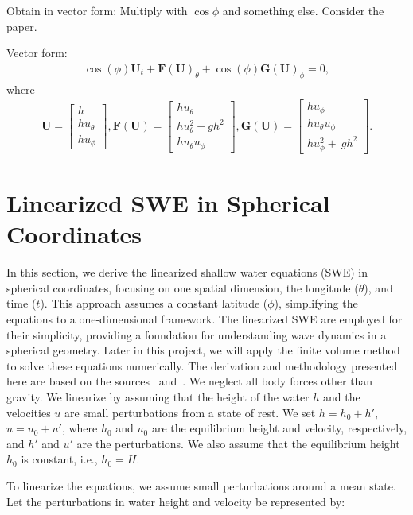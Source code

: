 Obtain in vector form:
Multiply with $\cos \phi$ and something else. Consider the paper.

Vector form:
\begin{align}
    \cos(\phi) \mathbf{U}_t + \mathbf{F(U)}_\theta + \cos(\phi) \mathbf{G(U)}_\phi = 0,
\end{align}
where 
\begin{align*}
    \mathbf{U} = \begin{bmatrix} h \\ h u_\theta \\h u_\phi \end{bmatrix},
    \mathbf{F(U)} = \begin{bmatrix} h u_\theta \\ h u_\theta^2 + g h^2  \\ h u_\theta u_\phi \end{bmatrix},
    \mathbf{G(U)} = \begin{bmatrix} h u_\phi \\ h u_\theta u_\phi \\ h u_\phi^2 + \ g h^2 \end{bmatrix}.
\end{align*}



\section{Linearized SWE in Spherical Coordinates}
In this section, we derive the linearized shallow water equations (SWE) in spherical coordinates, focusing on one spatial dimension, the longitude ($\theta$), and time ($t$).
This approach assumes a constant latitude ($\phi$), simplifying the equations to a one-dimensional framework.
The linearized SWE are employed for their simplicity, providing a foundation for understanding wave dynamics in a spherical geometry.
Later in this project, we will apply the finite volume method to solve these equations numerically.
The derivation and methodology presented here are based on the sources~\cite{BONEV_2018} and~\cite{Eskilsson_2005}.
We neglect all body forces other than gravity.
We linearize by assuming that the height of the water $h$ and the velocities $u$ are small perturbations from a state of rest.
We set $h = h_0 + h'$, $u = u_0 + u'$, where $h_0$ and $u_0$ are the equilibrium height and velocity, respectively, and $h'$ and $u'$ are the perturbations.
We also assume that the equilibrium height $h_0$ is constant, i.e., $h_0 = H$.

To linearize the equations, we assume small perturbations around a mean state. Let the perturbations in water height and velocity be represented by:

